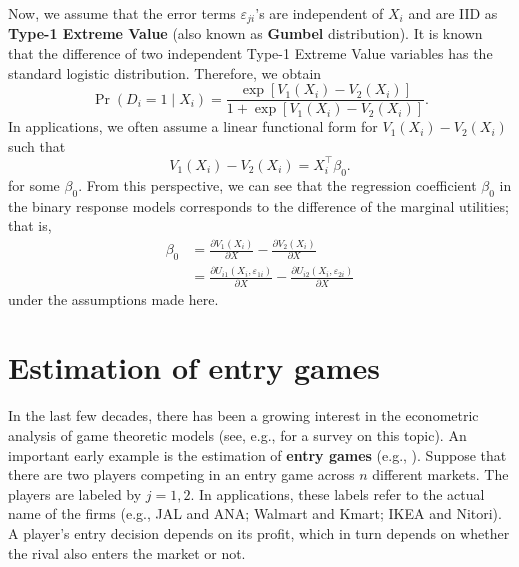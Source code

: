 \documentclass[10.5pt, A4paper, openany, uplatex]{book}
\newcommand{\eps}{\varepsilon}
\numberwithin{equation}{section}
\begin{document}
Now, we assume that the error terms $\eps_{ji}$'s are independent of $X_i$ and are IID as \textbf{Type-1 Extreme Value} (also known as \textbf{Gumbel} distribution).
It is known that the difference of two independent Type-1 Extreme Value variables has the standard logistic distribution.
Therefore, we obtain
\[
	\Pr(D_i = 1 \mid X_i) = \frac{\exp[V_1(X_i) - V_2(X_i)]}{1 + \exp[V_1(X_i) - V_2(X_i)]}.
\]
In applications, we often assume a linear functional form for $V_1(X_i) - V_2(X_i)$ such that
\[
	V_1(X_i) - V_2(X_i) = X_i^\top \beta_0.
\]
for some $\beta_0$.
From this perspective, we can see that the regression coefficient $\beta_0$ in the binary response models corresponds to the difference of the marginal utilities; that is, 
\begin{align*}
	\beta_0 
	& = \frac{\partial V_1(X_i)}{\partial X} - \frac{\partial V_2(X_i)}{\partial X}\\
	& = \frac{\partial U_{i1}(X_i, \eps_{1i})}{\partial X} - \frac{\partial U_{i2}(X_i, \eps_{2i})}{\partial X}
\end{align*}
under the assumptions made here.

\section{Estimation of entry games}\label{sec:games}

In the last few decades, there has been a growing interest in the econometric analysis of game theoretic models (see, e.g., \cite{de2013econometric} for a survey on this topic).
An important early example is the estimation of \textbf{entry games} (e.g., \cite{bresnahan1990entry,berry1992estimation}).
Suppose that there are two players competing in an entry game across $n$ different markets.
The players are labeled by $j = 1, 2$.
In applications, these labels refer to the actual name of the firms (e.g., JAL and ANA; Walmart and Kmart; IKEA and Nitori). 
A player's entry decision depends on its profit, which in turn depends on whether the rival also enters the market or not.
\end{document}
